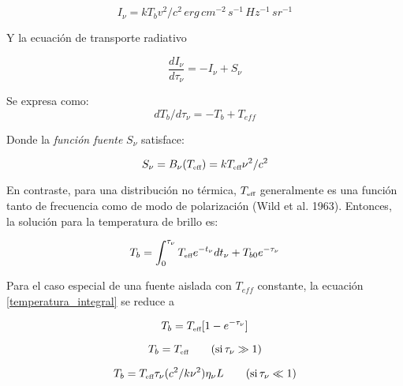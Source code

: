 \begin{equation} \label{temperatura_brillo}
I_\nu = kT_bv^2/c^2\, erg \, cm^{-2} \,s^{-1} \,Hz^{-1} \,sr^{-1}
\end{equation}


Y la ecuaci\'on de transporte radiativo

\begin{equation}
\frac{dI_{\nu}}{d\tau_{\nu}}=-I_{\nu}+S_{\nu}
\end{equation}  

Se expresa como:
\begin{equation} \label{diferencial_temperatura}
dT_b/d\tau_\nu = -T_b + T_{eff}
\end{equation}

Donde la \emph{funci\'on fuente} $S_{\nu}$ satisface:

\begin{equation} \label{fuente}
S_\nu = B_{\nu}(T_{\mbox{\tiny eff}})=kT_{\mbox{\tiny eff}}\nu^2/c^2
\end{equation}

En contraste, para una distribuci\'on no t\'ermica, $T_{\mbox{\tiny eff}}$ generalmente es una funci\'on tanto de frecuencia como de modo de polarizaci\'on (Wild et al. 1963). Entonces, la soluci\'on para la temperatura de brillo es:

\begin{equation} \label{temperatura_integral}
T_{b} = \int_{0}^{\tau_\nu} T_{\mbox{\tiny eff}} e^{-t_\nu} dt_\nu + T_{b0} e^{-\tau_\nu}
\end{equation}

Para el caso especial de una fuente aislada con $T_{eff}$ constante, la ecuaci\'on \ref{temperatura_integral} se reduce a

\begin{equation} \label{t_brillo1}
T_{b} = T_{\mbox{\tiny eff}}[1-e^{-\tau_\nu}]
\end{equation}

\begin{equation} \label{t_brillo2}
T_{b} = T_{\mbox{\tiny eff}} \qquad (\mbox{si} \, \tau_\nu \gg 1)
\end{equation}

\begin{equation} \label{t_brillo3}
T_{b} = T_{\mbox{\tiny eff}} \tau_\nu (c^2/k\nu^2)\eta_ \nu L \qquad (\mbox{si} \, \tau_\nu \ll 1)
\end{equation}


